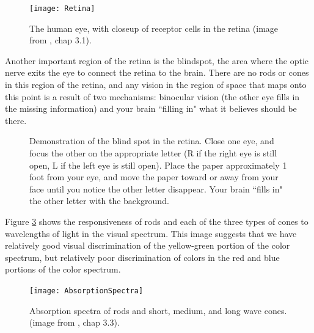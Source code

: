 \documentclass[11pt]{isuthesis}\usepackage[]{graphicx}\usepackage[]{color}
\begin{document}
\begin{figure}
\centering
\texttt{[image: Retina]}
\caption[The human eye, with closeup of receptor cells in the retina]{The human eye, with closeup of receptor cells in the retina (image from \protect\citealt{goldstein}, chap 3.1).} \label{fig:retina}
\end{figure}

Another important region of the retina is the blindspot, the area where the optic nerve exits the eye to connect the retina to the brain. There are no rods or cones in this region of the retina, and any vision in the region of space that maps onto this point is a result of two mechanisms: binocular vision (the other eye fills in the missing information) and your brain ``filling in" what it believes should be there.

\begin{figure}[htbp]\centering
\begin{center}
\end{center}
\caption[Demonstration of the blind spot in the retina]{Demonstration of the blind spot in the retina. Close one eye, and focus the other on the appropriate letter (R if the right eye is still open, L if the left eye is still open). Place the paper approximately 1 foot from your eye, and move the paper toward or away from your face until you notice the other letter disappear. Your brain ``fills in" the other letter with the background.}\label{fig:blindspot}
\end{figure}

Figure \ref{fig:ColorRange} shows the responsiveness of rods and each of the three types of cones to wavelengths of light in the visual spectrum. This image suggests that we have relatively good visual discrimination of the yellow-green portion of the color spectrum, but relatively poor discrimination of colors in the red and blue portions of the color spectrum. 

\begin{figure}[htbp]\centering
\texttt{[image: AbsorptionSpectra]}
\caption[Absorption spectra of retinal cells]{Absorption spectra of rods and short, medium, and long wave cones. (image from \protect\citealt{goldstein}, chap 3.3).} \label{fig:ColorRange}
\end{figure}
\end{document}

